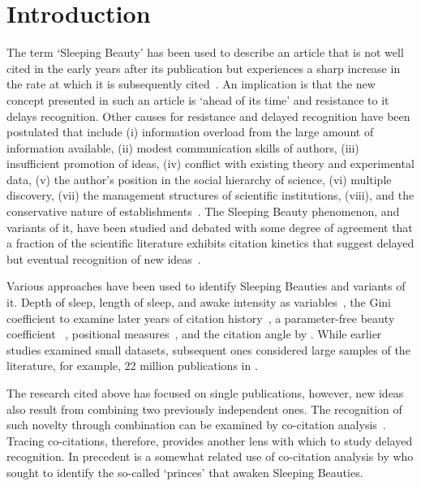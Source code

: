\documentclass[11pt, oneside]{article}   	%
\begin{document}
\section{Introduction}

The term `Sleeping Beauty' has been used to describe an article that is not well cited in the early years after its publication but experiences a sharp increase in the rate at which it is subsequently cited~\citep{Raan2004}. An implication is that the new concept presented in such an article is `ahead of its time' and resistance to it delays recognition. Other causes for resistance and delayed recognition have been postulated that include (i) information overload from the large amount of information available, (ii)  modest communication skills of authors, (iii) insufficient promotion of ideas, (iv) conflict with existing theory and experimental data, (v) the author's position in the social hierarchy of science, (vi)  multiple discovery, (vii) the management structures of scientific institutions, (viii), and the conservative nature of establishments~\citep{Barber1961,Merton1963,Cole1970,Garfield1970a,Garfield1980a}. The Sleeping Beauty phenomenon, and variants of it, have been studied and debated with some degree of agreement that a fraction of the scientific literature exhibits citation kinetics that suggest delayed but eventual recognition of new ideas~\citep{Glanzel2003,Glanzel2004,Raan2004,redner_2005,Braun_2010,Li2014,Ke2015,Li2016,Song2018,sugimoto_mostafa_2018,ye_bornmann_2018,Raan2019}. 

Various approaches have been used to identify Sleeping Beauties and variants of it. Depth of sleep, length of sleep, and awake intensity as variables~\citep{Raan2004}, the Gini coefficient to examine later years of citation history~\citep{li_2014}, a parameter-free beauty coefficient ~\citep{Ke2015}, positional measures~\citep{costas2010}, and the citation angle by \cite{ye_bornmann_2018}. While earlier studies examined small datasets, subsequent ones considered large samples of the literature, for example, 22 million publications in \cite{Ke2015}.
	
The research cited above has focused on single publications, however, new ideas also result from combining two previously independent ones. The recognition of such novelty through combination can be examined by co-citation analysis~\citep{MarshakovaShaikevich1973,Small1973,Uzzi2013,Boyack2014,Wang2017,Bradley2020}. Tracing co-citations, therefore, provides another lens with which to study delayed recognition.  In precedent is a somewhat related use of co-citation analysis by \cite{zong_2018,teixeira2017sleeping} who sought to identify the so-called `princes' that awaken Sleeping Beauties. 
\end{document}
